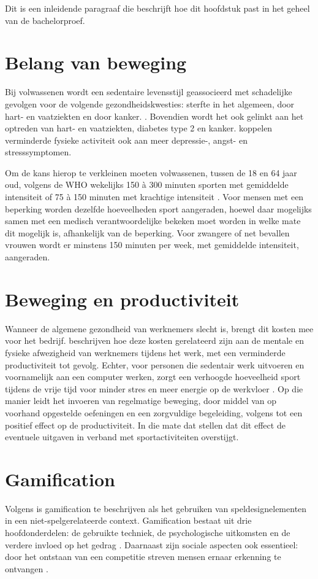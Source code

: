 Dit is een inleidende paragraaf die beschrijft hoe dit hoofdstuk past in het geheel van de bachelorproef.

\section{Belang van beweging}
Bij volwassenen wordt een sedentaire levensstijl geassocieerd met schadelijke gevolgen voor de volgende gezondheidskwesties: sterfte in het algemeen, door hart- en vaatziekten en door kanker. \autocite{Bull2020}. Bovendien wordt het ook gelinkt aan het optreden van hart- en vaatziekten, diabetes type 2 en kanker. \textcite{Stanton2020} koppelen verminderde fysieke activiteit ook aan meer depressie-, angst- en stresssymptomen.

Om de kans hierop te verkleinen moeten volwassenen, tussen de 18 en 64 jaar oud, volgens de WHO wekelijks 150 à 300 minuten sporten met gemiddelde intensiteit of 75 à 150 minuten met krachtige intensiteit \autocite{Bull2020}. Voor mensen met een beperking worden dezelfde hoeveelheden sport aangeraden, hoewel daar mogelijks samen met een medisch verantwoordelijke bekeken moet worden in welke mate dit mogelijk is, afhankelijk van de beperking. Voor zwangere of net bevallen vrouwen wordt er minstens 150 minuten per week, met gemiddelde intensiteit, aangeraden.

\section{Beweging en productiviteit}
Wanneer de algemene gezondheid van werknemers slecht is, brengt dit kosten mee voor het bedrijf. \textcite{Sjoegaard2016} beschrijven hoe deze kosten gerelateerd zijn aan de mentale en fysieke afwezigheid van werknemers tijdens het werk, met een verminderde productiviteit tot gevolg. Echter, voor personen die sedentair werk uitvoeren en voornamelijk aan een computer werken, zorgt een verhoogde hoeveelheid sport tijdens de vrije tijd voor minder stres en meer energie op de werkvloer \autocite{Hansen2009}. Op die manier leidt het invoeren van regelmatige beweging, door middel van op voorhand opgestelde oefeningen en een zorgvuldige begeleiding, volgens \textcite{Cancelliere2011} tot een positief effect op de productiviteit. In die mate dat \textcite{Sjoegaard2016} stellen dat dit effect de eventuele uitgaven in verband met sportactiviteiten overstijgt.

\section{Gamification}
Volgens \textcite{Deterding2011} is gamification te beschrijven als het gebruiken van speldesignelementen in een niet-spelgerelateerde context. Gamification bestaat uit drie hoofdonderdelen: de gebruikte techniek, de psychologische uitkomsten en de verdere invloed op het gedrag \autocite{Hamari2014}. Daarnaast zijn sociale aspecten ook essentieel: door het ontstaan van een competitie streven mensen ernaar erkenning te ontvangen \autocite{Hamari2013}.

